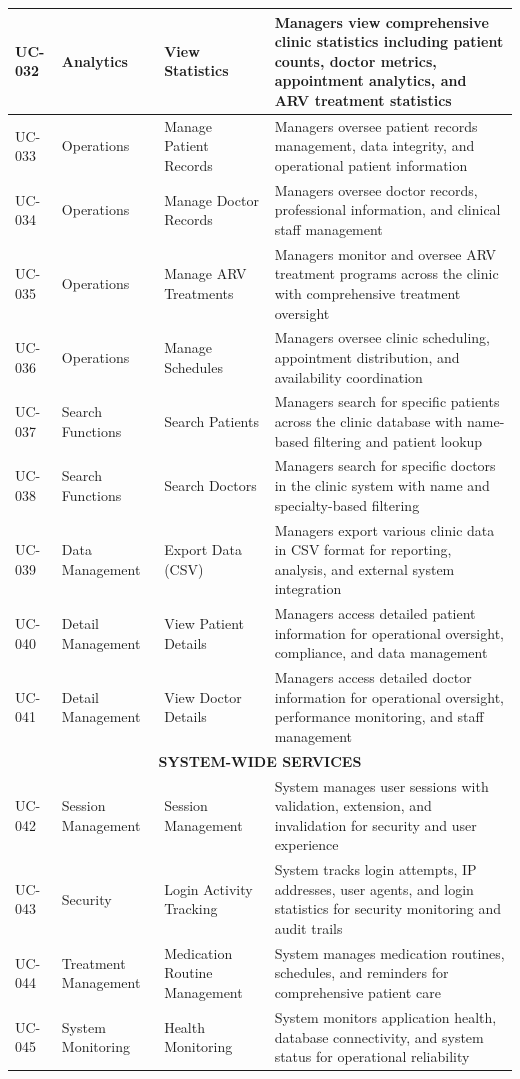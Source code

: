 \documentclass[12pt,a4paper]{article}
\begin{document}
\begin{longtable}{|p{1cm}|p{3.5cm}|p{3.5cm}|p{6cm}|}
\hline
UC-032 & Analytics & View Statistics & Managers view comprehensive clinic statistics including patient counts, doctor metrics, appointment analytics, and ARV treatment statistics \\
\hline
UC-033 & Operations & Manage Patient Records & Managers oversee patient records management, data integrity, and operational patient information \\
\hline
UC-034 & Operations & Manage Doctor Records & Managers oversee doctor records, professional information, and clinical staff management \\
\hline
UC-035 & Operations & Manage ARV Treatments & Managers monitor and oversee ARV treatment programs across the clinic with comprehensive treatment oversight \\
\hline
UC-036 & Operations & Manage Schedules & Managers oversee clinic scheduling, appointment distribution, and availability coordination \\
\hline
UC-037 & Search Functions & Search Patients & Managers search for specific patients across the clinic database with name-based filtering and patient lookup \\
\hline
UC-038 & Search Functions & Search Doctors & Managers search for specific doctors in the clinic system with name and specialty-based filtering \\
\hline
UC-039 & Data Management & Export Data (CSV) & Managers export various clinic data in CSV format for reporting, analysis, and external system integration \\
\hline
UC-040 & Detail Management & View Patient Details & Managers access detailed patient information for operational oversight, compliance, and data management \\
\hline
UC-041 & Detail Management & View Doctor Details & Managers access detailed doctor information for operational oversight, performance monitoring, and staff management \\
\hline
\multicolumn{4}{|c|}{\textbf{SYSTEM-WIDE SERVICES}} \\
\hline
UC-042 & Session Management & Session Management & System manages user sessions with validation, extension, and invalidation for security and user experience \\
\hline
UC-043 & Security & Login Activity Tracking & System tracks login attempts, IP addresses, user agents, and login statistics for security monitoring and audit trails \\
\hline
UC-044 & Treatment Management & Medication Routine Management & System manages medication routines, schedules, and reminders for comprehensive patient care \\
\hline
UC-045 & System Monitoring & Health Monitoring & System monitors application health, database connectivity, and system status for operational reliability \\
\hline
\end{longtable}
\end{document}
